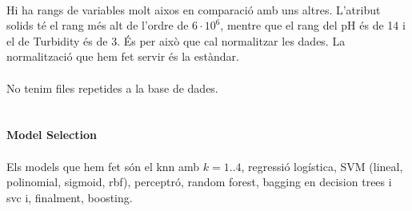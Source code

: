 \documentclass{article}
\begin{document}
	\\
	Hi ha rangs de variables molt aixos en comparació amb uns altres. L'atribut solids té el rang més alt de l'ordre de $6\cdot10^6$, mentre que el rang del pH és de 14 i el de Turbidity és de 3. És per això que cal normalitzar les dades. La normalització que hem fet servir és la estàndar.\\
	\\
	No tenim files repetides a la base de dades.\\
	\\
	\\
	\textbf{Model Selection}\\
	\\	
	Els models que hem fet són el knn amb $k=1..4$, regressió logística, SVM (lineal, polinomial, sigmoid, rbf), perceptró, random forest, bagging en decision trees i svc i, finalment, boosting.\\
\end{document}
